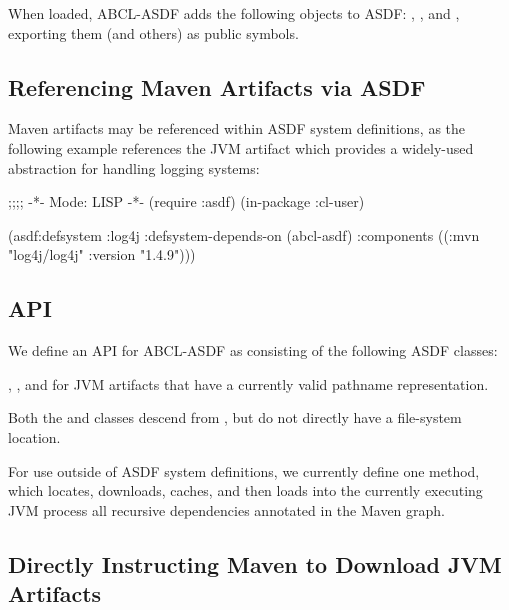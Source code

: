\documentclass[10pt]{book}
\begin{document}


When loaded, \textsc{ABCL-ASDF} adds the following objects to
\textsc{ASDF}: , ,
 and , exporting them (and
others) as public symbols.

\subsection{Referencing Maven Artifacts via ASDF}

Maven artifacts may be referenced within \textsc{ASDF} system
definitions, as the following example references the
 JVM artifact which provides a widely-used
abstraction for handling logging systems:

\begin{listing-lisp}
  ;;;; -*- Mode: LISP -*-
  (require :asdf)
  (in-package :cl-user)

  (asdf:defsystem :log4j
     :defsystem-depends-on (abcl-asdf)
     :components ((:mvn "log4j/log4j" :version "1.4.9")))
\end{listing-lisp}

\subsection{API}

We define an API for \textsc{ABCL-ASDF} as consisting of the following
\textsc{ASDF} classes:

, , and
 for JVM artifacts that have a currently
valid pathname representation.

Both the  and  classes descend from
, but do not directly have a file-system location.

For use outside of ASDF system definitions, we currently define one
method,  which locates,
downloads, caches, and then loads into the currently executing JVM
process all recursive dependencies annotated in the Maven
 graph.

\subsection{Directly Instructing Maven to Download JVM Artifacts}
\end{document}
